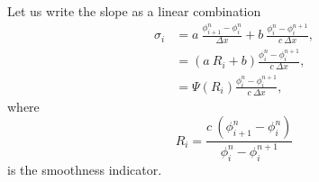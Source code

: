 \documentclass[../thesis.tex]{subfiles}
\begin{document}
Let us write the slope as a linear combination
\begin{equation}
    \begin{split}
        \sigma_{i} &= a~\frac{\phi_{i+1}^{n}-\phi_{i}^{n}}{\Delta x}
        + b~\frac{\phi_{i}^{n} - \phi_{i}^{n+1}}{c~\Delta x},
        \\
        &=\left( a~R_{i} + b \right)
        \frac{\phi_{i}^{n} - \phi_{i}^{n+1}}{c~\Delta x},
        \\
        &=\Psi(R_{i})\frac{\phi_{i}^{n} - \phi_{i}^{n+1}}{c~\Delta x},
    \end{split}
\end{equation}
where
\begin{equation}
    R_{i} =
    \frac{c~\left( \phi_{i+1}^{n}-\phi_{i}^{n} \right)}
    {\phi_{i}^{n} - \phi_{i}^{n+1}}
\end{equation}
is the smoothness indicator.
\end{document}
